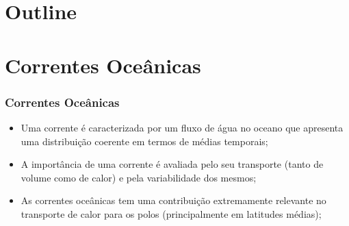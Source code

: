 \author[Filipe Fernandes]{Filipe P. A. Fernandes}
\date[Novembro 2012]{12 de Novembro 2012}




\begin{frame}[plain]
  \titlepage
\end{frame}

\section*{Outline}
\begin{frame}
\tableofcontents
\end{frame}
%

\section{Correntes Oceânicas}
\begin{frame}
\frametitle{Correntes Oceânicas}
  \begin{itemize}[<+-| alert@+>]
    \item Uma corrente é caracterizada por um fluxo de água no oceano que
          apresenta uma distribuição coerente em termos de médias temporais;
    \item A importância de uma corrente é avaliada pelo seu transporte (tanto
          de volume como de calor) e pela variabilidade dos mesmos;
    \item As correntes oceânicas tem uma contribuição extremamente relevante no
          transporte de calor para os polos (principalmente em latitudes médias);
  \end{itemize}
\end{frame}


